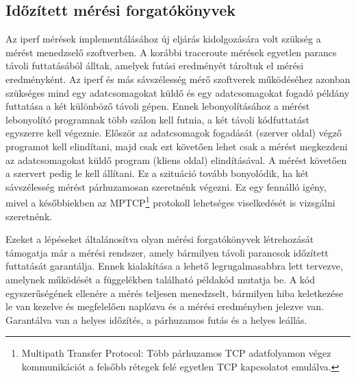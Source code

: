 \subsection{Időzített mérési forgatókönyvek}
Az iperf mérések implementálásához új eljárás kidolgozására volt szükség a mérést menedzselő szoftverben. A korábbi traceroute mérések egyetlen parancs távoli futtatásából álltak, amelyek futási eredményét tároltuk el mérési eredményként. Az iperf és más sávszélesség mérő szoftverek működéséhez azonban szükséges mind egy adatcsomagokat küldő és egy adatcsomagokat fogadó példány futtatása a két különböző távoli gépen. Ennek lebonyolításához a mérést lebonyolító programnak több szálon kell futnia, a két távoli kódfuttatást egyszerre kell végeznie. Először az adatcsomagok fogadását (szerver oldal) végző programot kell elindítani, majd csak ezt követően lehet csak a mérést megkezdeni az adatcsomagokat küldő program (kliens oldal) elindításával. A mérést követően a szervert pedig le kell állítani. Ez a szituáció tovább bonyolódik, ha két sávszélesség mérést párhuzamosan szeretnénk végezni. Ez egy fennálló igény, mivel a későbbiekben az MPTCP\footnote{Multipath Transfer Protocol: Több párhuzamos TCP adatfolyamon végez kommunikációt a felsőbb rétegek felé egyetlen TCP kapcsolatot emulálva.} protokoll lehetséges viselkedését is vizsgálni szeretnénk.

Ezeket a lépéseket általánosítva olyan mérési forgatókönyvek létrehozását támogatja már a mérési rendszer, amely bármilyen távoli parancsok időzített futtatását garantálja. Ennek kialakítása a lehető legrugalmasabbra lett tervezve, amelynek működését a függelékben található példakód mutatja be. A kód egyszerűségének ellenére a mérés teljesen menedzselt, bármilyen hiba keletkezése le van kezelve és megfelelően naplózva és a mérési eredményben jelezve van. Garantálva van a helyes időzítés, a párhuzamos futás és a helyes leállás.



